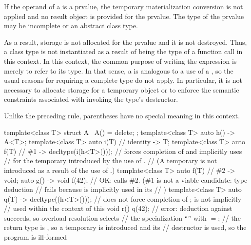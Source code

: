 \pnum
If the operand of a  is a prvalue,
the temporary materialization conversion is not applied
and no result object is provided for the prvalue.
The type of the prvalue may be incomplete or an abstract class type.
\begin{note}
As a result, storage is not allocated for the prvalue and it is not destroyed.
Thus, a class type is not instantiated
as a result of being the type of a function call in this context.
In this context, the common purpose of
writing the expression is merely to refer to its type. In that sense, a
 is analogous to a use of a ,
so the usual reasons for requiring a complete type do not apply. In particular,
it is not necessary to allocate storage for a temporary object or to enforce the
semantic constraints associated with invoking the type's destructor.
\end{note}
\begin{note}
Unlike the preceding rule, parentheses have no special meaning in this context.
\end{note}
\begin{example}
\begin{codeblock}
template<class T> struct A { ~A() = delete; };
template<class T> auto h()
  -> A<T>;
template<class T> auto i(T)     // identity
  -> T;
template<class T> auto f(T)     // \#1
  -> decltype(i(h<T>()));       // forces completion of  and implicitly uses 
                                // for the temporary introduced by the use of .
                                // (A temporary is not introduced as a result of the use of .)
template<class T> auto f(T)     // \#2
  -> void;
auto g() -> void {
  f(42);                        // OK: calls \#2. (\#1 is not a viable candidate: type deduction
                                // fails because  is implicitly used in its
                                // )
}
template<class T> auto q(T)
  -> decltype((h<T>()));        // does not force completion of ;  is not implicitly
                                // used within the context of this 
void r() {
  q(42);                        // error: deduction against  succeeds, so overload resolution selects
                                // the specialization ``'' with $=$;
                                // the return type is , so a temporary is introduced and its
                                // destructor is used, so the program is ill-formed
}
\end{codeblock}
\end{example}

